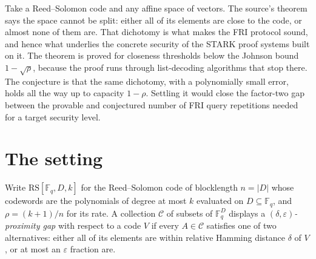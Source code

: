 \documentclass{conjura-conjecture}
\newcommand{\F}{\mathbb{F}}
\newcommand{\eps}{\varepsilon}
\newcommand{\RS}{\mathrm{RS}}
\begin{document}

\vspace{0.4em}

\begin{informalconjecture}
Take a Reed--Solomon code and any affine space of vectors. The source's
theorem says the space cannot be split: either all of its elements are
close to the code, or almost none of them are. That dichotomy is what
makes the FRI protocol sound, and hence what underlies the concrete
security of the STARK proof systems built on it. The theorem is proved
for closeness thresholds below the Johnson bound $1 - \sqrt{\rho}$,
because the proof runs through list-decoding algorithms that stop there.
The conjecture is that the same dichotomy, with a polynomially small
error, holds all the way up to capacity $1 - \rho$. Settling it would
close the factor-two gap between the provable and conjectured number of
FRI query repetitions needed for a target security level.
\end{informalconjecture}

\section{The setting}\label{sec:setting}

Write $\RS[\F_{q}, D, k]$ for the Reed--Solomon code of blocklength $n =
|D|$ whose codewords are the polynomials of degree at most $k$ evaluated
on $D \subseteq \F_{q}$, and $\rho = (k+1)/n$ for its rate. A collection
$\mathcal{C}$ of subsets of $\F_{q}^{D}$ displays a
\emph{$(\delta,\eps)$-proximity gap} with respect to a code $V$ if every
$A \in \mathcal{C}$ satisfies one of two alternatives: either all of its
elements are within relative Hamming distance $\delta$ of $V$, or at most
an $\eps$ fraction are.
\end{document}
